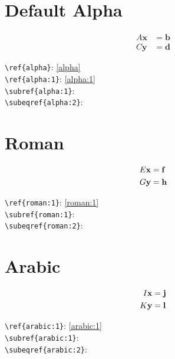 \documentclass{article}
\begin{document}
\section*{Default Alpha}
\begin{subequations}\label{alpha}
\begin{align}
  A\mathbf{x} &= \mathbf{b} \label{alpha:1}\\
  C\mathbf{y} &= \mathbf{d} \label{alpha:2}
\end{align}
\end{subequations}

\noindent
\verb|\ref{alpha}|: \ref{alpha}\\
\verb|\ref{alpha:1}|: \ref{alpha:1}\\
\verb|\subref{alpha:1}|: \\
\verb|\subeqref{alpha:2}|: 

\section*{Roman}
\begin{subequations}\label{roman}
\renewcommand{\theequation}{\theparentequation\roman{equation}}
\begin{align}
  E\mathbf{x} &= \mathbf{f} \label{roman:1}\\
  G\mathbf{y} &= \mathbf{h} \label{roman:2}
\end{align}
\end{subequations}

\noindent
\verb|\ref{roman:1}|: \ref{roman:1}\\
\verb|\subref{roman:1}|: \\
\verb|\subeqref{roman:2}|: 

\section*{Arabic}
\begin{subequations}\label{arabic}
\renewcommand{\theequation}{\theparentequation\arabic{equation}}
\begin{align}
  I\mathbf{x} &= \mathbf{j} \label{arabic:1}\\
  K\mathbf{y} &= \mathbf{l} \label{arabic:2}
\end{align}
\end{subequations}

\noindent
\verb|\ref{arabic:1}|: \ref{arabic:1}\\
\verb|\subref{arabic:1}|: \\
\verb|\subeqref{arabic:2}|: 
\end{document}
